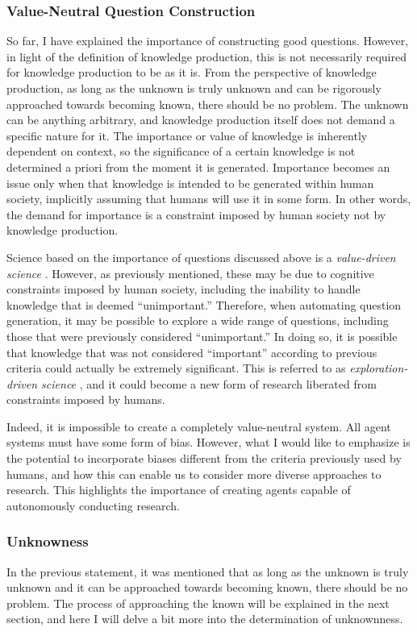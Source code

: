 \documentclass{book}
\begin{document}
\subsubsection{Value-Neutral Question Construction}

So far, I have explained the importance of constructing good questions. However, in light of the definition of knowledge production, this is not necessarily required for knowledge production to be as it is. From the perspective of knowledge production, as long as the unknown is truly unknown and can be rigorously approached towards becoming known, there should be no problem. The unknown can be anything arbitrary, and knowledge production itself does not demand a specific nature for it. The importance or value of knowledge is inherently dependent on context, so the significance of a certain knowledge is not determined a priori from the moment it is generated. Importance becomes an issue only when that knowledge is intended to be generated within human society, implicitly assuming that humans will use it in some form. In other words, the demand for importance is a constraint imposed by human society not by knowledge production.

Science based on the importance of questions discussed above is a \textit{value-driven science} \cite{kitano2021nobel}. However, as previously mentioned, these may be due to cognitive constraints imposed by human society, including the inability to handle knowledge that is deemed ``unimportant.'' Therefore, when automating question generation, it may be possible to explore a wide range of questions, including those that were previously considered ``unimportant.'' In doing so, it is possible that knowledge that was not considered ``important'' according to previous criteria could actually be extremely significant. This is referred to as \textit{exploration-driven science} \cite{kitano2021nobel}, and it could become a new form of research liberated from constraints imposed by humans. 

Indeed, it is impossible to create a completely value-neutral system. All agent systems must have some form of bias. However, what I would like to emphasize is the potential to incorporate biases different from the criteria previously used by humans, and how this can enable us to consider more diverse approaches to research. This highlights the importance of creating agents capable of autonomously conducting research.

\subsubsection{Unknowness}
In the previous statement, it was mentioned that as long as the unknown is truly unknown and it can be approached towards becoming known, there should be no problem. The process of approaching the known will be explained in the next section, and here I will delve a bit more into the determination of unknownness. 
\end{document}

